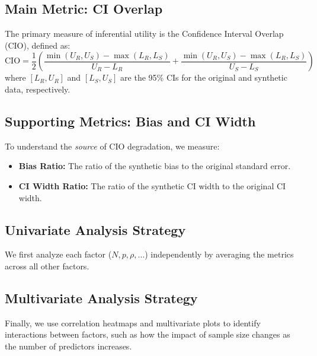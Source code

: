 \subsection{Main Metric: CI Overlap}
The primary measure of inferential utility is the Confidence Interval Overlap (CIO), defined as:
\begin{equation}
    \text{CIO} = \frac{1}{2} \left( \frac{\min(U_R, U_S) - \max(L_R, L_S)}{U_R - L_R} + \frac{\min(U_R, U_S) - \max(L_R, L_S)}{U_S - L_S} \right)
\end{equation}
where $[L_R, U_R]$ and $[L_S, U_S]$ are the 95\% CIs for the original and synthetic data, respectively.

\subsection{Supporting Metrics: Bias and CI Width}
To understand the \emph{source} of CIO degradation, we measure:
\begin{itemize}
    \item \textbf{Bias Ratio:} The ratio of the synthetic bias to the original standard error.
    \item \textbf{CI Width Ratio:} The ratio of the synthetic CI width to the original CI width.
\end{itemize}

\subsection{Univariate Analysis Strategy}
We first analyze each factor ($N, p, \rho, \dots$) independently by averaging the metrics across all other factors.

\subsection{Multivariate Analysis Strategy}
Finally, we use correlation heatmaps and multivariate plots to identify interactions between factors, such as how the impact of sample size changes as the number of predictors increases.

